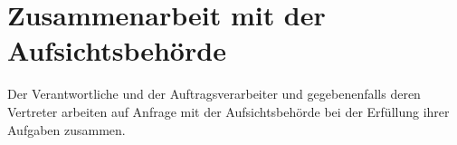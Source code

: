 \chapter{Zusammenarbeit mit der Aufsichtsbehörde}
\label{ch:31}


Der Verantwortliche und der Auftragsverarbeiter und gegebenenfalls deren Vertreter arbeiten auf Anfrage mit der
Aufsichtsbehörde bei der Erfüllung ihrer Aufgaben zusammen.


